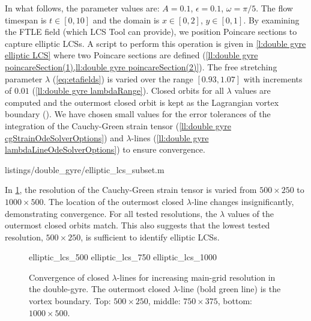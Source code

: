 \documentclass{article}
\newlength\figurewidth
\begin{document}


In what follows, the parameter values are: $A = 0.1$, $\epsilon = 0.1$, $\omega = \pi/5$.
The flow timespan is $t \in [0,10]$ and the domain is $x \in [0,2]$, $y \in [0,1]$.
By examining the FTLE field (which LCS Tool can provide), we position Poincare sections to capture elliptic LCSs.
A script to perform this operation is given in \cref{l:double gyre elliptic LCS} where two Poincare sections are defined (\cref{ll:double gyre poincareSection(1),ll:double gyre poincareSection(2)}).
The free stretching parameter $\lambda$ (\cref{eq:etafields}) is varied over the range $[0.93,1.07]$ with increments of $0.01$ (\cref{ll:double gyre lambdaRange}).
Closed orbits for all $\lambda$ values are computed and the outermost closed orbit is kept as the Lagrangian vortex boundary  ().
We have chosen small values for the error tolerances of the integration of the Cauchy-Green strain tensor (\cref{ll:double gyre cgStrainOdeSolverOptions}) and $\lambda$-lines (\cref{ll:double gyre lambdaLineOdeSolverOptions}) to ensure convergence.


{listings/double_gyre/elliptic_lcs_subset.m}

In \cref{f:double gyre lambda LCS convergence}, the resolution of the  Cauchy-Green strain tensor is varied from $500 \times 250$ to $1000 \times 500$. The location of the outermost closed $\lambda$-line changes insignificantly, demonstrating convergence. For all tested resolutions, the $\lambda$ values of the outermost closed orbits match.
This also suggests that the lowest tested resolution, $500 \times 250$, is sufficient to identify elliptic LCSs.

\begin{figure}
\centering
\setlength{}
{elliptic_lcs_500}
{elliptic_lcs_750}
{elliptic_lcs_1000}
\caption{Convergence of closed $\lambda$-lines for increasing main-grid resolution in the double-gyre.
The outermost closed $\lambda$-line (bold green line) is the vortex boundary.
Top: $500 \times 250$, middle: $750 \times 375$, bottom: $1000 \times 500$.}
\label{f:double gyre lambda LCS convergence}
\end{figure}
\end{document}
